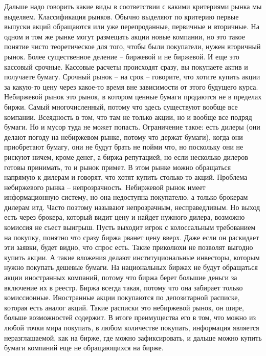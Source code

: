 \documentclass[a4paper, 12pt]{article}
\begin{document}
Дальше надо говорить какие виды в соответствии с какими критериями рынка мы выделяем. Классификация рынков. Обычно выделяют по критерию первые выпуски акций обращаются или уже перепроданные, первичные и вторичные. На одном и том же рынке могут размещать акции новые компании, но это такое понятие чисто теоретическое для того, чтобы были покупатели, нужен вторичный рынок. Более существенное деление -- биржевой и не биржевой. И еще это кассовый срочные. Кассовые расчеты происходят сразу, вы покупаете актив и получаете бумагу. Срочный рынок -- на срок -- говорите, что хотите купить акции за какую-то цену через какое-то время вне зависимости от этого будущего курса. Небиржевой рынок это рынок, в котором ценные бумаги продаются не в пределах биржи. Самый многочисленный, потому что здесь существуют вообще все компании. Всеядность в том, что там не только акции, но и вообще все подряд бумаги. Но и мусор туда не может попасть. Ограничение такое: есть дилеры (они делают погоду на небиржевом рынке, потому что держат бумаги), когда они приобретают бумагу, они не будут брать не пойми что, но поскольку они не рискуют ничем, кроме денег, а биржа репутацией, но если несколько дилеров готовы принимать, то и рынок примет. В этом рынке можно обращаться напрямую к дилерам и говорят, что хотят купить столько-то акций. Проблема небиржевого рынка -- непрозрачность. Небиржевой рынок имеет информационную систему, но она недоступна покупателю, а только брокерам дилерам итд. Часто поэтому называют непрозрачным, несправедливым. Но выход есть через брокера, который видит цену и найдет нужного дилера, возможно комиссия не съест выигрыш. Пусть выходит игрок с колоссальным требованием на покупку, понятно что сразу биржа рванет цену вверх. Даже если он раскидает эти заявки, будет видно, что спрос есть. Такие приколюхи не позволят выгодно купить акции. А такие вложения делают институциональные инвесторы, которым нужно покупать дешевые бумаги. На национальных биржах не будут обращаться акции иностранных компаний, потому что биржа берет большие деньги за включение их в реестр. Биржа всегда такая, потому что она забирает только комиссионные. Иностранные акции покупаются по депозитарной расписке, которая есть аналог акций. Такие расписки это небиржевой рынок, он шире, больше возможностей содержит. В итоге преимущества его в том, что можно из любой точки мира покупать, в любом количестве покупать, информация является неразглашаемой, как на бирже, где можно зафиксировать, и дальше можно купить бумаги компаний еще не обращающихся на бирже. 
\end{document}

